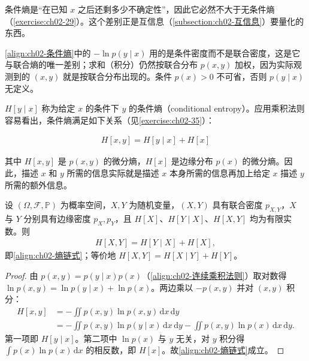 \documentclass[../../main.tex]{subfiles}
\begin{document}
\begin{remark}
条件熵是“在已知 $x$ 之后还剩多少不确定性”，因此它必然不大于无条件熵（\cref{exercise:ch02-29}）。这个差别正是互信息（\cref{subsection:ch02-互信息}）要量化的东西。

\eqref{align:ch02-条件熵}中的 $-\ln p(y\mid x)$ 用的是条件密度而不是联合密度，这是它与联合熵的唯一差别；求和（积分）仍然按联合分布 $p(x,y)$ 加权，因为实际观测到的 $(x,y)$ 就是按联合分布出现的。条件 $p(x)>0$ 不可省，否则 $p(y\mid x)$ 无定义。
\end{remark}

$H[y\mid x]$ 称为给定 $x$ 的条件下 $y$ 的条件熵（conditional entropy）。应用乘积法则容易看出，条件熵满足如下关系（见\cref{exercise:ch02-35}）：

\begin{align}
  H[x,y] = H[y\mid x] + H[x]
  \label{align:ch02-熵链式}
\end{align}

其中 $H[x,y]$ 是 $p(x,y)$ 的微分熵，$H[x]$ 是边缘分布 $p(x)$ 的微分熵。因此，描述 $x$ 和 $y$ 所需的信息实际就是描述 $x$ 本身所需的信息再加上给定 $x$ 描述 $y$ 所需的额外信息。

\begin{proposition}[熵的链式法则]\label{proposition:ch02-熵链式}
设 $(\Omega,\mathcal{F},\mathbb{P})$ 为概率空间，$X,Y$ 为随机变量，$(X,Y)$ 具有联合密度 $p_{X,Y}$，$X$ 与 $Y$ 分别具有边缘密度 $p_X,p_Y$，且 $H[X]$、$H[Y\mid X]$、$H[X,Y]$ 均为有限实数。则
\begin{align*}
  H[X,Y]=H[Y\mid X]+H[X],
\end{align*}
即\eqref{align:ch02-熵链式}；等价地 $H[X,Y]=H[X\mid Y]+H[Y]$。
\end{proposition}

\begin{proof}
由 $p(x,y)=p(y\mid x)p(x)$（\eqref{align:ch02-连续乘积法则}）取对数得 $\ln p(x,y)=\ln p(y\mid x)+\ln p(x)$。两边乘以 $-p(x,y)$ 并对 $(x,y)$ 积分：
\begin{align*}
  H[x,y] &= -\iint p(x,y)\ln p(x,y)\,\mathrm{d}x\,\mathrm{d}y \\
  &= -\iint p(x,y)\ln p(y\mid x)\,\mathrm{d}x\,\mathrm{d}y - \iint p(x,y)\ln p(x)\,\mathrm{d}x\,\mathrm{d}y .
\end{align*}
第一项即 $H[y\mid x]$。第二项中 $\ln p(x)$ 与 $y$ 无关，对 $y$ 积分得 $\int p(x)\ln p(x)\,\mathrm{d}x$ 的相反数，即 $H[x]$。故\eqref{align:ch02-熵链式}成立。
\end{proof}
\end{document}
